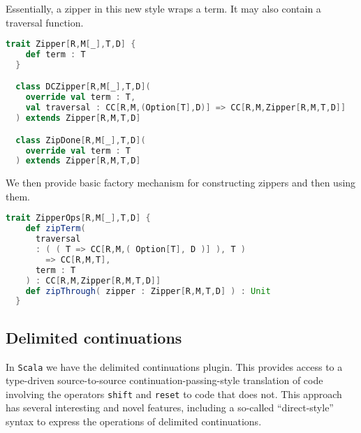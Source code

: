 Essentially, a zipper in this new style wraps a term. It may also
contain a traversal function.

\begin{lstlisting}[language=Scala,mathescape=true]  
  trait Zipper[R,M[_],T,D] {
    def term : T
  }

  class DCZipper[R,M[_],T,D](
    override val term : T,
    val traversal : CC[R,M,(Option[T],D)] => CC[R,M,Zipper[R,M,T,D]]
  ) extends Zipper[R,M,T,D]

  class ZipDone[R,M[_],T,D](
    override val term : T
  ) extends Zipper[R,M,T,D]
\end{lstlisting}

\break

We then provide basic factory mechanism for constructing zippers and
then using them.

\begin{lstlisting}[language=Scala,mathescape=true]
  trait ZipperOps[R,M[_],T,D] {
    def zipTerm(
      traversal
      : ( ( T => CC[R,M,( Option[T], D )] ), T )
        => CC[R,M,T],
      term : T
    ) : CC[R,M,Zipper[R,M,T,D]]
    def zipThrough( zipper : Zipper[R,M,T,D] ) : Unit
  }
\end{lstlisting}

\subsection{Delimited continuations}

In \texttt{Scala} we have the delimited continuations plugin. This
provides access to a type-driven source-to-source
continuation-passing-style translation of code involving the operators
\lstinline[language=Scala,mathescape=true]!shift! and
\lstinline[language=Scala,mathescape=true]!reset! to code that does
not. This approach has several interesting and novel features,
including a so-called ``direct-style'' syntax to express the
operations of delimited continuations.


